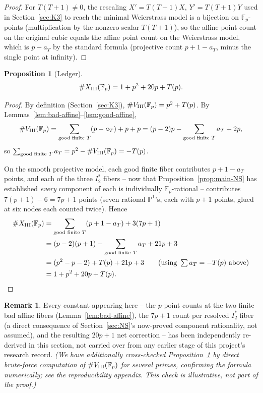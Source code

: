 \documentclass[11pt]{amsart}
\newtheorem{proposition}[theorem]{Proposition}
\theoremstyle{definition}
\newtheorem{remark}[theorem]{Remark}
\newcommand{\Fp}{\mathbb{F}_p}
\begin{document}
\begin{proof}
For $T(T+1)\neq0$, the rescaling $X'=T(T+1)X$, $Y'=T(T+1)Y$ used in
Section~\ref{sec:K3} to reach the minimal Weierstrass model is a
bijection on $\Fp$-points (multiplication by the nonzero scalar
$T(T+1)$), so the affine point count on the original cubic equals the
affine point count on the Weierstrass model, which is $p-a_T$ by the
standard formula (projective count $p+1-a_T$, minus the single point at
infinity).
\end{proof}

\begin{proposition}[Ledger]
\label{prop:ledger}
\[
\#X_{\rm III}(\Fp) = 1+p^2+20p+T(p).
\]
\end{proposition}

\begin{proof}
By definition (Section~\ref{sec:K3}), $\#V_{\rm III}(\Fp)=p^2+T(p)$.
By Lemmas~\ref{lem:bad-affine}--\ref{lem:good-affine},
\[
\#V_{\rm III}(\Fp) = \sum_{\text{good finite }T}(p-a_T) + p + p = (p-2)p - \sum_{\text{good finite }T}a_T + 2p,
\]
so $\sum_{\text{good finite }T}a_T = p^2 - \#V_{\rm III}(\Fp) = -T(p)$.

On the smooth projective model, each good finite fiber contributes
$p+1-a_T$ points, and each of the three $I_2^*$ fibers -- now that
Proposition~\ref{prop:main-NS} has established \emph{every} component of
each is individually $\Fp$-rational -- contributes $7(p+1)-6=7p+1$
points (seven rational $\mathbb{P}^1$'s, each with $p+1$ points, glued at six
nodes each counted twice). Hence
\begin{align*}
\#X_{\rm III}(\Fp) &= \sum_{\text{good finite }T}(p+1-a_T) + 3(7p+1)\\
&= (p-2)(p+1) - \sum_{\text{good finite }T}a_T + 21p+3\\
&= (p^2-p-2) + T(p) + 21p+3 \qquad\text{(using }\textstyle\sum a_T=-T(p)\text{ above)}\\
&= 1+p^2+20p+T(p).\qedhere
\end{align*}
\end{proof}

\begin{remark}
Every constant appearing here -- the $p$-point counts at the two finite
bad affine fibers (Lemma~\ref{lem:bad-affine}), the $7p+1$ count per
resolved $I_2^*$ fiber (a direct consequence of Section~\ref{sec:NS}'s
now-proved component rationality, not assumed), and the resulting $20p+1$
net correction -- has been independently re-derived in this section, not
carried over from any earlier stage of this project's research record.
\emph{(We have additionally cross-checked Proposition~\ref{prop:ledger}
by direct brute-force computation of $\#V_{\rm III}(\Fp)$ for several
primes, confirming the formula numerically; see the reproducibility
appendix. This check is illustrative, not part of the proof.)}
\end{remark}
\end{document}
